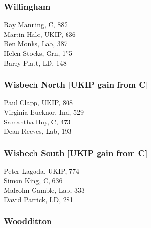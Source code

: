 \documentclass[a4paper,openany,10pt]{book}
\begin{document}
\subsubsection*{Willingham}



Ray Manning, C, 882\\
Martin Hale, UKIP, 636\\
Ben Monks, Lab, 387\\
Helen Stocks, Grn, 175\\
Barry Platt, LD, 148\\


\subsubsection*{Wisbech North \hspace*{\fill}\nolinebreak[1]%
\enspace\hspace*{\fill}
[UKIP gain from C]}



Paul Clapp, UKIP, 808\\
Virginia Bucknor, Ind, 529\\
Samantha Hoy, C, 473\\
Dean Reeves, Lab, 193\\


\subsubsection*{Wisbech South \hspace*{\fill}\nolinebreak[1]%
\enspace\hspace*{\fill}
[UKIP gain from C]}



Peter Lagoda, UKIP, 774\\
Simon King, C, 636\\
Malcolm Gamble, Lab, 333\\
David Patrick, LD, 281\\


\subsubsection*{Woodditton}

\end{document}
